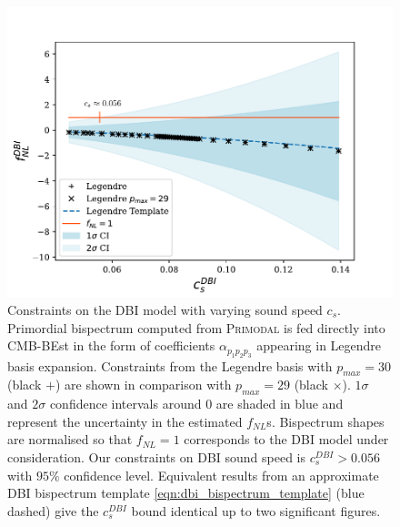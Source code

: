 \begin{figure}[htbp!] 
	\centering    
	\includegraphics[width=\textwidth]{dbi_sound_speed_scan_annotated_new.pdf}
	\caption{Constraints on the DBI model with varying sound speed $c_s$. Primordial bispectrum computed from \textsc{Primodal} is fed directly into CMB-BEst in the form of coefficients $\alpha_{p_1 p_2 p_3}$ appearing in Legendre basis expansion. Constraints from the Legendre basis with $p_{max}=30$ (black $+$) are shown in comparison with $p_{max}=29$ (black $\times$). $1\sigma$ and $2\sigma$ confidence intervals around $0$ are shaded in blue and represent the uncertainty in the estimated $f_{NL}$s. Bispectrum shapes are normalised so that $f_{NL}=1$ corresponds to the DBI model under consideration. Our constraints on DBI sound speed is $c^{DBI}_s > 0.056$ with $95\%$ confidence level. Equivalent results from an approximate DBI bispectrum template \eqref{eqn:dbi_bispectrum_template} (blue dashed) give the $c^{DBI}_s$ bound identical up to two significant figures.}
	\label{fig:dbi_sound_speed_scan}
\end{figure}

